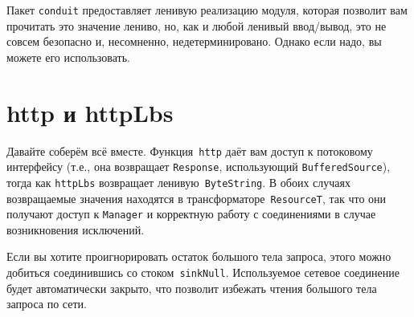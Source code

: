 \begin{remark}
    Пакет \texttt{conduit} предоставляет ленивую реализацию модуля, которая
    позволит вам прочитать это значение лениво, но, как и любой ленивый
    ввод/вывод, это не совсем безопасно и, несомненно, недетерминировано.
    Однако если надо, вы можете его использовать.
\end{remark}

\section{http и httpLbs}
Давайте соберём всё вместе. Функция~\lstinline!http! даёт вам доступ к
потоковому интерфейсу (т.е., она возвращает \lstinline!Response!, использующий
\lstinline!BufferedSource!), тогда как \lstinline!httpLbs! возвращает
ленивую~\lstinline!ByteString!. В обоих случаях возвращаемые значения находятся
в трансформаторе~\lstinline!ResourceT!, так что они получают доступ к
\lstinline!Manager! и корректную работу с соединениями в случае возникновения
исключений.

\begin{remark}
    Если вы хотите проигнорировать остаток большого тела запроса, этого можно
    добиться соединившись со стоком~\lstinline!sinkNull!. Используемое сетевое
    соединение будет автоматически закрыто, что позволит избежать чтения
    большого тела запроса по сети.
\end{remark}
